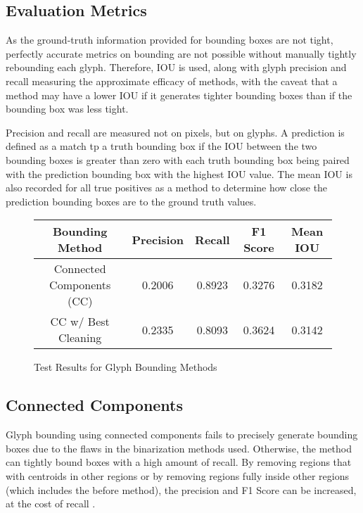 \subsection{Evaluation Metrics}

As the ground-truth information provided for bounding boxes are not tight, perfectly accurate metrics on bounding are not possible without manually tightly rebounding each glyph. Therefore, IOU is used, along with glyph precision and recall measuring the approximate efficacy of methods, with the caveat that a method may have a lower IOU if it generates tighter bounding boxes than if the bounding box was less tight.

Precision and recall are measured not on pixels, but on glyphs. A prediction is defined as a match tp a truth bounding box if the IOU between the two bounding boxes is greater than zero with each truth bounding box being paired with the prediction bounding box with the highest IOU value. The mean IOU is also recorded for all true positives as a method to determine how close the prediction bounding boxes are to the ground truth values.

\begin{figure}[H]
    \caption{Test Results for Glyph Bounding Methods}
    \label{fig:boundingEval}
    \centering
    \begin{tabular}{ | c | c | c | c | c | }
        \hline
        Bounding Method & Precision & Recall & F1 Score & Mean IOU \\
        \hline
        Connected Components (CC) & 0.2006 & 0.8923 & 0.3276 & 0.3182 \\
        CC w/ Best Cleaning & 0.2335 & 0.8093 & 0.3624 & 0.3142 \\
        \hline
    \end{tabular}
\end{figure}

\subsection{Connected Components}

Glyph bounding using connected components fails to precisely generate bounding boxes due to the flaws in the binarization methods used. Otherwise, the method can tightly bound boxes with a high amount of recall. By removing regions that with centroids in other regions or by removing regions fully inside other regions (which includes the before method), the precision and F1 Score can be increased, at the cost of recall .


